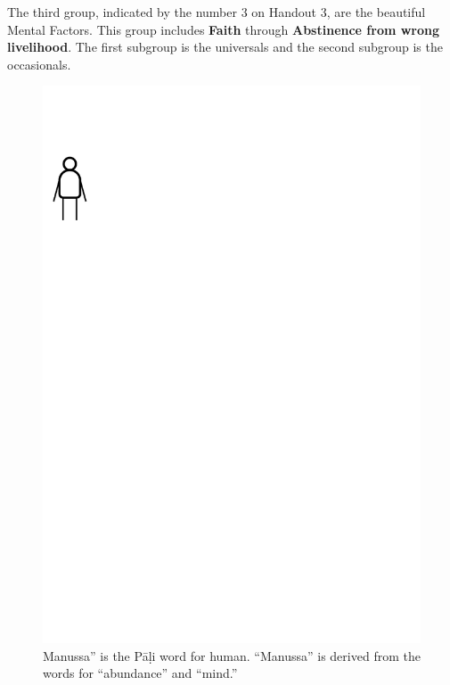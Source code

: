 The third group, indicated by the number 3 on Handout 3, are the beautiful Mental Factors. This group includes \textbf{Faith} through \textbf{Abstinence from wrong livelihood}. The first subgroup is the universals and the second subgroup is the occasionals.

\begin{figure}[H]
\centering
\includegraphics[width=1.0\linewidth]{./Diagrams/Key}
\caption{Manussa” is the Pāḷi word for human. “Manussa” is derived from the words for “abundance” and “mind.”}
\label{fig:Key}
\end{figure}

